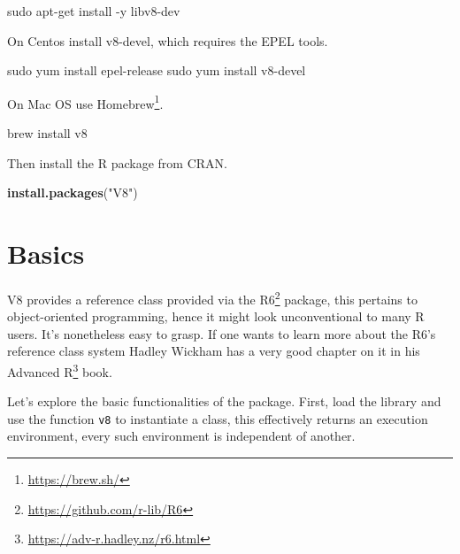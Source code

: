 \documentclass[
]{krantz}
\makeatletter
\newenvironment{Shaded}{\begin{snugshade}}{\end{snugshade}}
\newcommand{\ExtensionTok}[1]{#1}
\newcommand{\FunctionTok}[1]{\textcolor[rgb]{0,0,0}{#1}}
\newcommand{\KeywordTok}[1]{\textcolor[rgb]{0.27,0.27,0.27}{\textbf{#1}}}
\newcommand{\NormalTok}[1]{#1}
\newcommand{\StringTok}[1]{\textcolor[rgb]{0.5,0.5,0.5}{#1}}
\renewcommand{\href}[2]{#2\footnote{\url{#1}}}
\newenvironment{kframe}{%
\medskip{}
\setlength{\fboxsep}{.8em}
 \def\at@end@of@kframe{}%
 \ifinner\ifhmode%
  \def\at@end@of@kframe{\end{minipage}}%
  \begin{minipage}{\columnwidth}%
 \fi\fi%
 \def\FrameCommand##1{\hskip\@totalleftmargin \hskip-\fboxsep
 \colorbox{shadecolor}{##1}\hskip-\fboxsep
     \hskip-\linewidth \hskip-\@totalleftmargin \hskip\columnwidth}%
 \MakeFramed {\advance\hsize-\width
   \@totalleftmargin\z@ \linewidth\hsize
   \@setminipage}}%
 {\par\unskip\endMakeFramed%
 \at@end@of@kframe}
\renewenvironment{Shaded}{\begin{kframe}}{\end{kframe}}
\makeatother
\begin{document}
\begin{Shaded}
\begin{Highlighting}[]
\FunctionTok{sudo}\NormalTok{ apt{-}get install {-}y libv8{-}dev}
\end{Highlighting}
\end{Shaded}

On Centos install v8-devel, which requires the EPEL tools.

\begin{Shaded}
\begin{Highlighting}[]
\FunctionTok{sudo}\NormalTok{ yum install epel{-}release}
\FunctionTok{sudo}\NormalTok{ yum install v8{-}devel}
\end{Highlighting}
\end{Shaded}

On Mac OS use \href{https://brew.sh/}{Homebrew}.

\begin{Shaded}
\begin{Highlighting}[]
\ExtensionTok{brew}\NormalTok{ install v8}
\end{Highlighting}
\end{Shaded}

Then install the R package from CRAN.

\begin{Shaded}
\begin{Highlighting}[]
\KeywordTok{install.packages}\NormalTok{(}\StringTok{"V8"}\NormalTok{)}
\end{Highlighting}
\end{Shaded}

\hypertarget{basics-1}{%
\section*{Basics}\label{basics-1}}


V8 provides a reference class provided via the \href{https://github.com/r-lib/R6}{R6} \citep{R-R6} package, this pertains to object-oriented programming, hence it might look unconventional to many R users. It's nonetheless easy to grasp. If one wants to learn more about the R6's reference class system Hadley Wickham has a very good chapter on it in his \href{https://adv-r.hadley.nz/r6.html}{Advanced R} book.

Let's explore the basic functionalities of the package. First, load the library and use the function \texttt{v8} to instantiate a class, this effectively returns an execution environment, every such environment is independent of another.
\end{document}
